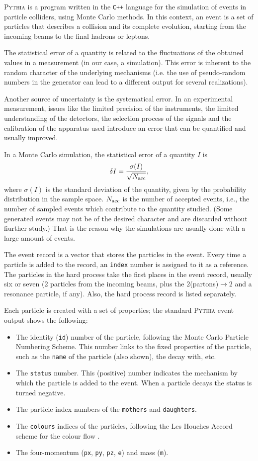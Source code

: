 \documentclass[a4paper,12pt]{article}
\begin{document}
\textsc{Pythia} is a program written in the \verb|C++| language for the simulation of events in particle colliders, using Monte Carlo methods. In this context, an event is a set of particles that describes a collision and its complete evolution, starting from the incoming beams to the final hadrons or leptons.

The statistical error of a quantity is related to the fluctuations of the obtained values in a measurement (in our case, a simulation). This error is  inherent to the random character of the underlying mechanisms (i.e. the use of pseudo-random numbers in the generator can lead to a different output for several realizations).

Another source of uncertainty is the systematical error. In an experimental measurement, issues like the limited precision of the instruments, the limited understanding of the detectors, the selection process of the signals and the calibration of the apparatus used introduce an error that can be quantified and usually improved.

In a Monte Carlo simulation, the statistical error of a quantity $I$ is
$$
\delta I = \frac{\sigma (I)}{\sqrt {N_{\mathrm{acc}}}},
$$
where $\sigma (I)$ is the standard deviation of the quantity, given by the probability distribution in the sample space. $N_{\mathrm{acc}}$ is the number of accepted events, i.e., the number of sampled events which contribute to the quantity studied. (Some generated events may not be of the desired character and are discarded without fiurther study.) That is the reason why the simulations are usually done with a large amount of events.

The event record is a vector that stores the particles in the event. Every time a particle is added to the record, an \verb|index| number is assigned to it as a reference. The particles in the hard process take the first places in the event record, usually six or seven (2 particles from the incoming beams, plus the $2$(partons)$\to2$ and a resonance particle, if any). Also, the hard process record is listed separately.

Each particle is created with a set of properties; the standard \textsc{Pythia} event output shows the following:
\begin{itemize}    
\item The identity (\verb|id|) number of the particle, following the Monte Carlo Particle Numbering Scheme\cite{Beringer:1900zz}. This number links to the fixed properties of the particle, such as the \verb|name| of the particle (also shown), the decay with, etc.
\item The \verb|status| number. This (positive) number indicates the mechanism by which the particle is added to the event. When a particle decays the status is turned negative.
\item The particle index numbers of the \verb|mothers| and \verb|daughters|.
\item The \verb|colours| indices of the particles, following the Les Houches Accord scheme for the colour flow \cite{Boos:2001cv}.
\item The four-momentum (\verb|px|, \verb|py|, \verb|pz|, \verb|e|) and mass (\verb|m|).
\end{itemize}
\end{document}
